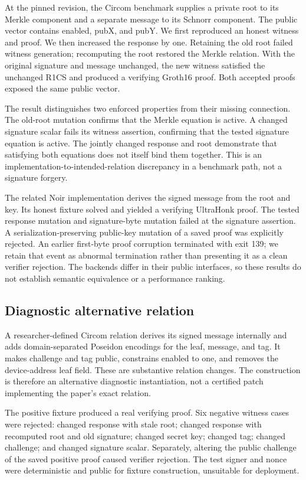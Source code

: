 \documentclass[sigconf,nonacm]{acmart}
\begin{document}
At the pinned revision, the Circom benchmark supplies a private root to its Merkle component and a separate message to its Schnorr component. The public vector contains enabled, pubX, and pubY. We first reproduced an honest witness and proof. We then increased the response by one. Retaining the old root failed witness generation; recomputing the root restored the Merkle relation. With the original signature and message unchanged, the new witness satisfied the unchanged R1CS and produced a verifying Groth16 proof. Both accepted proofs exposed the same public vector.

The result distinguishes two enforced properties from their missing connection. The old-root mutation confirms that the Merkle equation is active. A changed signature scalar fails its witness assertion, confirming that the tested signature equation is active. The jointly changed response and root demonstrate that satisfying both equations does not itself bind them together. This is an implementation-to-intended-relation discrepancy in a benchmark path, not a signature forgery.

The related Noir implementation derives the signed message from the root and key. Its honest fixture solved and yielded a verifying UltraHonk proof. The tested response mutation and signature-byte mutation failed at the signature assertion. A serialization-preserving public-key mutation of a saved proof was explicitly rejected. An earlier first-byte proof corruption terminated with exit 139; we retain that event as abnormal termination rather than presenting it as a clean verifier rejection. The backends differ in their public interfaces, so these results do not establish semantic equivalence or a performance ranking.

\subsection{Diagnostic alternative relation}
A researcher-defined Circom relation derives its signed message internally and adds domain-separated Poseidon encodings for the leaf, message, and tag. It makes challenge and tag public, constrains enabled to one, and removes the device-address leaf field. These are substantive relation changes. The construction is therefore an alternative diagnostic instantiation, not a certified patch implementing the paper's exact relation.

The positive fixture produced a real verifying proof. Six negative witness cases were rejected: changed response with stale root; changed response with recomputed root and old signature; changed secret key; changed tag; changed challenge; and changed signature scalar. Separately, altering the public challenge of the saved positive proof caused verifier rejection. The test signer and nonce were deterministic and public for fixture construction, unsuitable for deployment.
\end{document}
